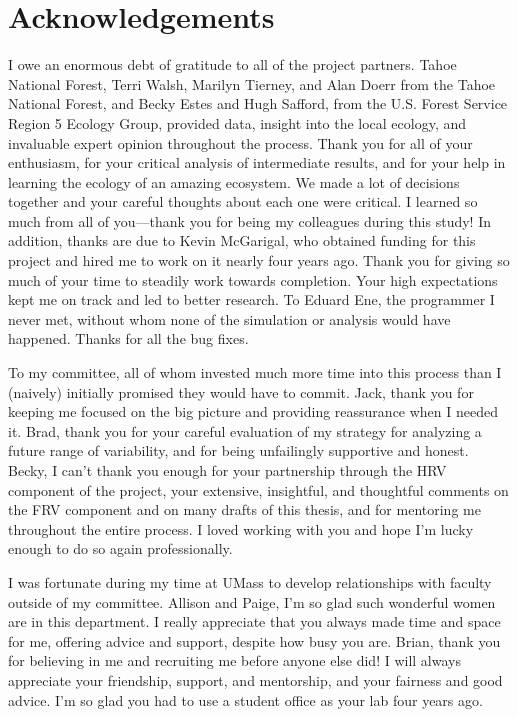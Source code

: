 
\chapter*{Acknowledgements}

I owe an enormous debt of gratitude to all of the project partners.  Tahoe National Forest, Terri Walsh, Marilyn Tierney, and Alan Doerr from the Tahoe National Forest, and Becky Estes and Hugh Safford, from the U.S. Forest Service Region 5 Ecology Group, provided data, insight into the local ecology, and invaluable expert opinion throughout the process. Thank you for all of your enthusiasm, for your critical analysis of intermediate results, and for your help in learning the ecology of an amazing ecosystem. We made a lot of decisions together and your careful thoughts about each one were critical. I learned so much from all of you---thank you for being my colleagues during this study! In addition, thanks are due to Kevin McGarigal, who obtained funding for this project and hired me to work on it nearly four years ago. Thank you for giving so much of your time to steadily work towards completion. Your high expectations kept me on track and led to better research. To Eduard Ene, the programmer I never met, without whom none of the simulation or analysis would have happened. Thanks for all the bug fixes.

To my committee, all of whom invested much more time into this process than I (naively) initially promised they would have to commit. Jack, thank you for keeping me focused on the big picture and providing reassurance when I needed it. Brad, thank you for your careful evaluation of my strategy for analyzing a future range of variability, and for being unfailingly supportive and honest. Becky, I can't thank you enough for your partnership through the HRV component of the project, your extensive, insightful, and thoughtful comments on the FRV component and on many drafts of this thesis, and for mentoring me throughout the entire process. I loved working with you and hope I'm lucky enough to do so again professionally.

I was fortunate during my time at UMass to develop relationships with faculty outside of my committee. Allison and Paige, I'm so glad such wonderful women are in this department. I really appreciate that you always made time and space for me, offering advice and support, despite how busy you are. Brian, thank you for believing in me and recruiting me before anyone else did! I will always appreciate your friendship, support, and mentorship, and your fairness and good advice. I'm so glad you had to use a student office as your lab four years ago.

